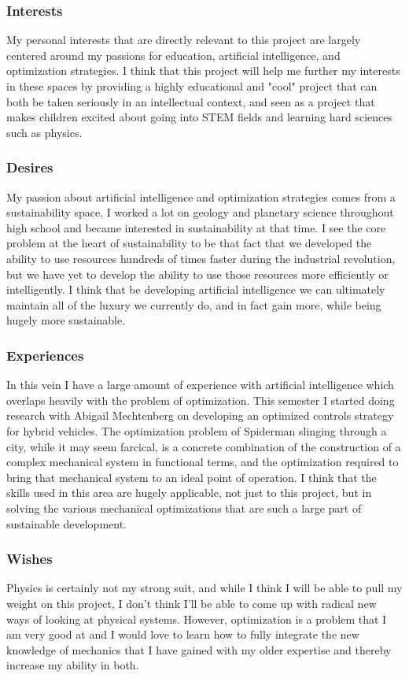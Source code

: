 \subsubsection{Interests}
My personal interests that are directly relevant to this project are largely centered around my passions for education, artificial intelligence, and optimization strategies. I think that this project will help me further my interests in these spaces by providing a highly educational and "cool" project that can both be taken seriously in an intellectual context, and seen as a project that makes children excited about going into STEM fields and learning hard sciences such as physics.
\subsubsection{Desires}
My passion about artificial intelligence and optimization strategies comes from a sustainability space. I worked a lot on geology and planetary science throughout high school and became interested in sustainability at that time. I see the core problem at the heart of sustainability to be that fact that we developed the ability to use resources hundreds of times faster during the industrial revolution, but we have yet to develop the ability to use those resources more efficiently or intelligently. I think that be developing artificial intelligence we can ultimately maintain all of the luxury we currently do, and in fact gain more, while being hugely more sustainable.

\subsubsection{Experiences}
In this vein I have a large amount of experience with artificial intelligence which overlaps heavily with the problem of optimization. This semester I started doing research with Abigail Mechtenberg on developing an optimized controls strategy for hybrid vehicles. The optimization problem of Spiderman slinging through a city, while it may seem farcical, is a concrete combination of the construction of a complex mechanical system in functional  terms, and the optimization required to bring that mechanical system to an ideal point of operation. I think that the skills used in this area are hugely applicable, not just to this project, but in solving the various mechanical optimizations that are such a large part of sustainable development.

\subsubsection{Wishes}
Physics is certainly not my strong suit, and while I think I will be able to pull my weight on this project, I don't think I'll be able to come up with radical new ways of looking at physical systems. However, optimization is a problem that I am very good at and I would love to learn how to fully integrate the new knowledge of mechanics that I have gained with my older expertise and thereby increase my ability in both.